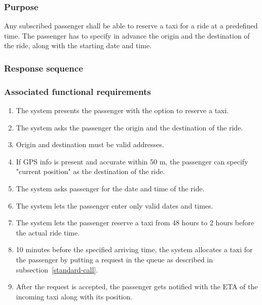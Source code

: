 \subsubsection{Purpose}

Any subscribed passenger shall be able to reserve a taxi for a ride at a predefined time. The passenger has to specify in advance the origin and the destination of the ride, along with the starting date and time.

\subsubsection{Response sequence}

\subsubsection{Associated functional requirements}
\begin{enumerate}
\item The system presents the passenger with the option to reserve a taxi.
\item The system asks the passenger the origin and the destination of the ride.
\item Origin and destination must be valid addresses.
\item If GPS info is present and accurate within 50 m, the passenger can specify "current position" as the destination of the ride.
\item The system asks passenger for the date and time of the ride.
\item The system lets the passenger enter only valid dates and times.
\item The system lets the passenger reserve a taxi from 48 hours to 2 hours before the actual ride time.
\item 10 minutes before the specified arriving time, the system allocates a taxi for the passenger by putting a request in the queue as described in subsection~\ref{standard-call}.
\item After the request is accepted, the passenger gets notified with the ETA of the incoming taxi along with its position.
\end{enumerate}